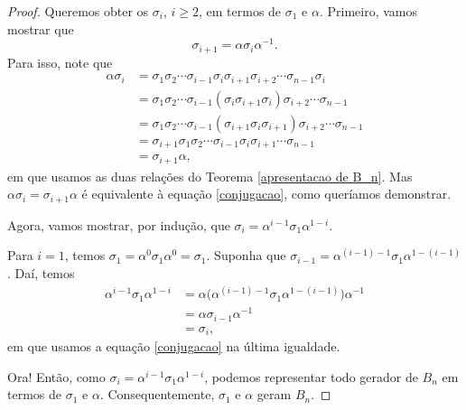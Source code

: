 	\begin{proof}
		Queremos obter os $\sigma_i$, $i\geq 2$, em termos de $\sigma_1$ e $\alpha$. Primeiro, 
		vamos mostrar que 
		\begin{equation}
		\label{conjugacao}
		    \sigma_{i+1} = \alpha\sigma_i\alpha^{-1}.
		\end{equation} 
		Para isso, note que 
		\begin{align*}
    		\alpha\sigma_i 
    		&= \sigma_1\sigma_2\cdots\sigma_{i-1}\sigma_i\sigma_{i+1}\sigma_{i+2}
    		\cdots\sigma_{n-1}\sigma_i \\
    		&= \sigma_1\sigma_2\cdots\sigma_{i-1}(\sigma_{i}\sigma_{i+1}\sigma_i)\sigma_{i+2}
    		\cdots\sigma_{n-1}  \\
    		&= \sigma_1\sigma_2\cdots\sigma_{i-1}(\sigma_{i+1}\sigma_i\sigma_{i+1})\sigma_{i+2}
    		\cdots\sigma_{n-1} \\
    		&= \sigma_{i+1}\sigma_1\sigma_2\cdots\sigma_{i-1}\sigma_i\sigma_{i+1}\cdots\sigma_{n-1} \\
    		&= \sigma_{i+1}\alpha,
		\end{align*}
		em que usamos as duas relações do Teorema \ref{apresentacao de B_n}. Mas 
		$\alpha\sigma_i = \sigma_{i+1}\alpha$ é equivalente à equação \eqref{conjugacao}, como 
		queríamos demonstrar.
		
		\par\vspace{0.3cm} Agora, vamos mostrar, por indução, que 
		$\sigma_i = \alpha^{i-1}\sigma_1\alpha^{1-i}$. 
		
		\par\vspace{0.3cm} Para $i=1$, temos $\sigma_1 = \alpha^0\sigma_1\alpha^0 = \sigma_1$. 
		Suponha que $\sigma_{i-1} = \alpha^{(i-1)-1}\sigma_1\alpha^{1-(i-1)}$. Daí, temos
		\begin{align*}
    		\alpha^{i-1}\sigma_1\alpha^{1-i} 
    		&= \alpha\Big( \alpha^{(i-1)-1}\sigma_1\alpha^{1- (i-1)} \Big) \alpha^{-1} \\
    		&= \alpha\sigma_{i-1}\alpha^{-1} \\
    		&= \sigma_i,
		\end{align*}
		em que usamos a equação \eqref{conjugacao} na última igualdade. 
		
		\par\vspace{0.3cm} Ora! Então, como $\sigma_i = \alpha^{i-1}\sigma_1\alpha^{1-i}$, 
		podemos representar todo gerador de $B_n$ em termos de $\sigma_1$ e $\alpha$. 
		Consequentemente, $\sigma_1$ e $\alpha$ geram $B_n$.
	\end{proof}
